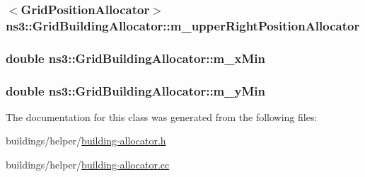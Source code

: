 \subsubsection[{\texorpdfstring{m\+\_\+upper\+Right\+Position\+Allocator}{m_upperRightPositionAllocator}}]{$<${\bf Grid\+Position\+Allocator}$>$ ns3\+::\+Grid\+Building\+Allocator\+::m\+\_\+upper\+Right\+Position\+Allocator\hspace{0.3cm}{\ttfamily [private]}}\hypertarget{classns3_1_1GridBuildingAllocator_afaf0278313ca8da37a2164a4428d69c8}{}\label{classns3_1_1GridBuildingAllocator_afaf0278313ca8da37a2164a4428d69c8}
\subsubsection[{\texorpdfstring{m\+\_\+x\+Min}{m_xMin}}]{\setlength{\rightskip}{0pt plus 5cm}double ns3\+::\+Grid\+Building\+Allocator\+::m\+\_\+x\+Min\hspace{0.3cm}{\ttfamily [private]}}\hypertarget{classns3_1_1GridBuildingAllocator_a7bcb4fb2c6e2471ae4a891c0df86e413}{}\label{classns3_1_1GridBuildingAllocator_a7bcb4fb2c6e2471ae4a891c0df86e413}
\subsubsection[{\texorpdfstring{m\+\_\+y\+Min}{m_yMin}}]{\setlength{\rightskip}{0pt plus 5cm}double ns3\+::\+Grid\+Building\+Allocator\+::m\+\_\+y\+Min\hspace{0.3cm}{\ttfamily [private]}}\hypertarget{classns3_1_1GridBuildingAllocator_a35886beb66427093d15cf0c367879f85}{}\label{classns3_1_1GridBuildingAllocator_a35886beb66427093d15cf0c367879f85}


The documentation for this class was generated from the following files\+:\begin{DoxyCompactItemize}
\item 
buildings/helper/\hyperlink{building-allocator_8h}{building-\/allocator.\+h}\item 
buildings/helper/\hyperlink{building-allocator_8cc}{building-\/allocator.\+cc}\end{DoxyCompactItemize}
